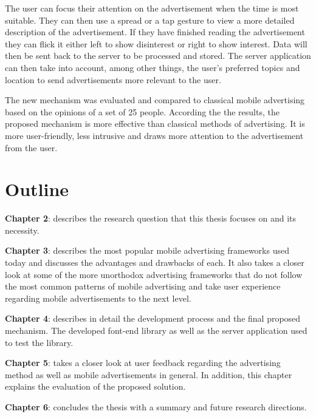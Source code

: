 The user can focus their attention on the advertisement when the time is most suitable. They can then use a spread or a tap gesture to view a more detailed description of the advertisement. If they have finished reading the advertisement they can flick it either left to show disinterest or right to show interest. Data will then be sent back to the server to be processed and stored. The server application can then take into account, among other things, the user's preferred topics and location to send advertisements more relevant to the user.

The new mechanism was evaluated and compared to classical mobile advertising based on the opinions of a set of 25 people. According the the results, the proposed mechanism is more effective than classical methods of advertising. It is more user-friendly, less intrusive and draws more attention to the advertisement from the user.

\section{Outline}

\noindent \textbf{Chapter 2}: describes the research question that this thesis focuses on and its necessity.

\noindent \textbf{Chapter 3}: describes the most popular mobile advertising frameworks used today and discusses the advantages and drawbacks of each. It also takes a closer look at some of the more unorthodox advertising frameworks that do not follow the most common patterns of mobile advertising and take user experience regarding mobile advertisements to the next level.

\noindent \textbf{Chapter 4}: describes in detail the development process and the final proposed mechanism. The developed font-end library as well as the server application used to test the library.

\noindent \textbf{Chapter 5}: takes a closer look at user feedback regarding the advertising method as well as mobile advertisements in general. In addition, this chapter explains the evaluation of the proposed solution.

\noindent \textbf{Chapter 6}: concludes the thesis with a summary and future research directions.